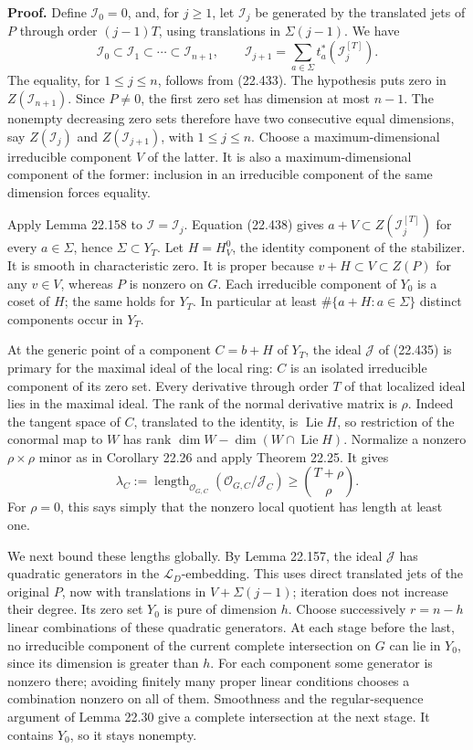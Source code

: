 \documentclass[
  11pt,
  a4paper,
]{article}
\newcounter{none} %
\begin{document}
\textbf{Proof.} Define \(\mathcal I_0=0\), and, for \(j\ge1\), let
\(\mathcal I_j\) be generated by the translated jets of \(P\) through
order \((j-1)T\), using translations in \(\Sigma(j-1)\). We have \[
 \mathcal I_0\subset\mathcal I_1\subset\cdots
      \subset\mathcal I_{n+1},\qquad
 \mathcal I_{j+1}
   =\sum_{a\in\Sigma}t_a^*(\mathcal I_j^{[T]}).
 \tag{22.438}
\] The equality, for \(1\le j\le n\), follows from (22.433). The
hypothesis puts zero in \(Z(\mathcal I_{n+1})\). Since \(P\ne0\), the
first zero set has dimension at most \(n-1\). The nonempty decreasing
zero sets therefore have two consecutive equal dimensions, say
\(Z(\mathcal I_j)\) and \(Z(\mathcal I_{j+1})\), with \(1\le j\le n\).
Choose a maximum-dimensional irreducible component \(V\) of the latter.
It is also a maximum-dimensional component of the former: inclusion in
an irreducible component of the same dimension forces equality.

Apply Lemma 22.158 to \(\mathcal I=\mathcal I_j\). Equation (22.438)
gives \(a+V\subset Z(\mathcal I_j^{[T]})\) for every \(a\in\Sigma\),
hence \(\Sigma\subset Y_T\). Let \(H=H_V^0\), the identity component of
the stabilizer. It is smooth in characteristic zero. It is proper
because \(v+H\subset V\subset Z(P)\) for any \(v\in V\), whereas \(P\)
is nonzero on \(G\). Each irreducible component of \(Y_0\) is a coset of
\(H\); the same holds for \(Y_T\). In particular at least
\(\#\{a+H:a\in\Sigma\}\) distinct components occur in \(Y_T\).

At the generic point of a component \(C=b+H\) of \(Y_T\), the ideal
\(\mathcal J\) of (22.435) is primary for the maximal ideal of the local
ring: \(C\) is an isolated irreducible component of its zero set. Every
derivative through order \(T\) of that localized ideal lies in the
maximal ideal. The rank of the normal derivative matrix is \(\rho\).
Indeed the tangent space of \(C\), translated to the identity, is
\(\operatorname{Lie}H\), so restriction of the conormal map to \(W\) has
rank \(\dim W-\dim(W\cap\operatorname{Lie}H)\). Normalize a nonzero
\(\rho\times\rho\) minor as in Corollary 22.26 and apply Theorem 22.25.
It gives \[
 \lambda_C:=
 \operatorname{length}_{\mathcal O_{G,C}}
                (\mathcal O_{G,C}/\mathcal J_C)
       \ge \binom{T+\rho}{\rho}.
 \tag{22.439}
\] For \(\rho=0\), this says simply that the nonzero local quotient has
length at least one.

We next bound these lengths globally. By Lemma 22.157, the ideal
\(\mathcal J\) has quadratic generators in the
\(\mathcal L_D\)-embedding. This uses direct translated jets of the
original \(P\), now with translations in \(V+\Sigma(j-1)\); iteration
does not increase their degree. Its zero set \(Y_0\) is pure of
dimension \(h\). Choose successively \(r=n-h\) linear combinations of
these quadratic generators. At each stage before the last, no
irreducible component of the current complete intersection on \(G\) can
lie in \(Y_0\), since its dimension is greater than \(h\). For each
component some generator is nonzero there; avoiding finitely many proper
linear conditions chooses a combination nonzero on all of them.
Smoothness and the regular-sequence argument of Lemma 22.30 give a
complete intersection at the next stage. It contains \(Y_0\), so it
stays nonempty.
\end{document}
